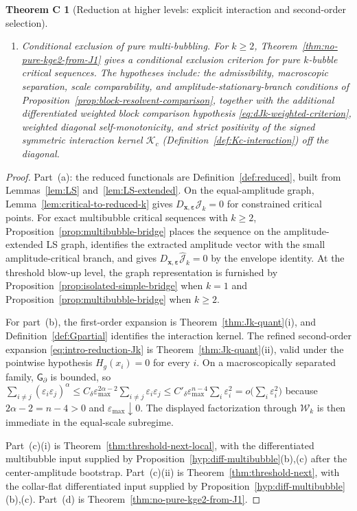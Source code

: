\documentclass[11pt,reqno,a4paper]{amsart}
\numberwithin{equation}{section}
\theoremstyle{plain}
\theoremstyle{remark}
\theoremstyle{plain}
\newtheorem*{thmC}{Theorem C}
\begin{document}
\begin{thmC}[Reduction at higher levels: explicit interaction and second-order selection]
\begin{enumerate}[label=\textup{(\alph*)},leftmargin=1.5em]
\item \emph{Conditional exclusion of pure multi-bubbling.}
For $k\ge2$, Theorem~\ref{thm:no-pure-kge2-from-J1} gives a conditional exclusion criterion for pure $k$-bubble critical sequences.
The hypotheses include: the admissibility, macroscopic separation, scale comparability, and amplitude-stationary-branch
conditions of Proposition~\ref{prop:block-resolvent-comparison}, together with the additional
differentiated weighted block comparison hypothesis
\eqref{eq:dJk-weighted-criterion},
weighted diagonal self-monotonicity, and strict positivity of the signed symmetric
interaction kernel $\mathcal K_c$ (Definition~\ref{def:Kc-interaction}) off the diagonal.
\end{enumerate}
\end{thmC}

\begin{proof}
Part~\textup{(a)}: the reduced functionals are Definition~\ref{def:reduced}, built from
Lemmas~\ref{lem:LS} and~\ref{lem:LS-extended}.  On the equal-amplitude graph,
Lemma~\ref{lem:critical-to-reduced-k} gives
$D_{\mathbf x,\boldsymbol\varepsilon}\mathcal J_k=0$ for constrained critical points.
For exact multibubble critical sequences with $k\ge2$, Proposition~\ref{prop:multibubble-bridge}
places the sequence on the amplitude-extended LS graph, identifies the extracted amplitude vector with the
small amplitude-critical branch, and gives
$D_{\mathbf x,\boldsymbol\varepsilon}\hat{\mathcal J}_k=0$ by the envelope identity.  At the threshold blow-up
level, the graph representation is furnished by Proposition~\ref{prop:isolated-simple-bridge} when $k=1$ and
Proposition~\ref{prop:multibubble-bridge} when $k\ge2$.

For part~(b), the first-order expansion is Theorem~\ref{thm:Jk-quant}\textup{(i)}, and Definition~\ref{def:Gpartial} identifies the interaction kernel.
The refined second-order expansion \eqref{eq:intro-reduction-Jk} is Theorem~\ref{thm:Jk-quant}\textup{(ii)},
valid under the pointwise hypothesis $H_g(x_i)=0$ for every $i$.
On a macroscopically separated family, $\mathsf G_\partial$ is bounded, so
$\sum_{i\neq j}(\varepsilon_i\varepsilon_j)^\alpha
\le C_\delta\varepsilon_{\max}^{2\alpha-2}\sum_{i\neq j}\varepsilon_i\varepsilon_j
\le C'_\delta\varepsilon_{\max}^{n-4}\sum_i\varepsilon_i^2
=o\bigl(\sum_i\varepsilon_i^2\bigr)$
because $2\alpha-2=n-4>0$ and $\varepsilon_{\max}\downarrow0$.
The displayed factorization through $\mathcal W_k$ is then immediate in the equal-scale subregime.

Part~(c)(i) is Theorem~\ref{thm:threshold-next-local}, with the differentiated multibubble input supplied by
Proposition~\ref{hyp:diff-multibubble}\textup{(b),(c)} after the center-amplitude bootstrap.
Part~(c)(ii) is Theorem~\ref{thm:threshold-next}, with the collar-flat differentiated input supplied by
Proposition~\ref{hyp:diff-multibubble}\textup{(b),(c)}.  Part~(d) is Theorem~\ref{thm:no-pure-kge2-from-J1}.
\end{proof}
\end{document}
